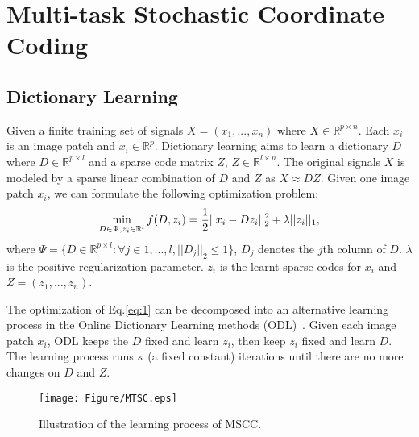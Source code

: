 \documentclass[10pt,twocolumn,letterpaper]{article}
\begin{document}
\section{Multi-task Stochastic Coordinate Coding}
\label{chap:1}
\subsection{Dictionary Learning}
\vspace{-0.7mm}
Given a finite training set of signals $X=(x_1,..., x_n)$ where $X \in \mathbb{R}^{p\times n} $. Each $x_i$ is an image patch and $x_i \in \mathbb{R}^p$. Dictionary learning aims to learn a dictionary $D$ where $D \in \mathbb{R}^{p\times l}$ and a sparse code matrix $Z$, $Z \in \mathbb{R}^{l\times n} $. The original signals $X$ is modeled by a sparse linear combination of $D$ and $Z$ as $X\approx DZ$. Given one image patch $x_i$, we can formulate the following optimization problem:
\vspace{-1.5mm}
\begin{equation}
\min_{D\in \Psi, z_i \in \mathbb{R}^{l}} f(D, z_i)  = \frac{1}{2}||x_i-Dz_i||^2_2+\lambda||z_i||_1,
\label{eq:1}
\vspace{-1.5mm}
\end{equation}
where $\Psi = \{ D \in \mathbb{R}^{p\times l}: \forall j\in 1,...,l, ||D_j||_2 \leq 1 \}$, $D_j$ denotes the $j$th column of $D$. $\lambda$ is the positive regularization parameter. $z_i$ is the learnt sparse codes for $x_i$ and $Z=(z_1,..., z_n)$.

The optimization of Eq.\ref{eq:1} can be decomposed into an alternative learning process in the Online Dictionary Learning methods (ODL)~\cite{mairal2009online}. Given each image patch $x_i$, ODL keeps the $D$ fixed and learn $z_i$, then keep $z_i$ fixed and learn $D$. The learning process runs $\kappa$ (a fixed constant) iterations until there are no more changes on $D$ and $Z$.

\begin{figure}
\centering
\texttt{[image: Figure/MTSC.eps]}
\vspace{-0.5em}
\caption{Illustration of the learning process of MSCC.}
\vspace{-1em}
\label{fig:3}
\end{figure}
\end{document}
